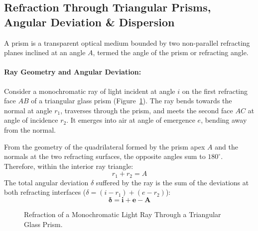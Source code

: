 \documentclass[10pt,twoside,openright]{book}
\begin{document}
\subsection{Refraction Through Triangular Prisms, Angular Deviation \& Dispersion}
A prism is a transparent optical medium bounded by two non-parallel refracting planes inclined at an angle $A$, termed the angle of the prism or refracting angle.

\paragraph{Ray Geometry and Angular Deviation:}
Consider a monochromatic ray of light incident at angle $i$ on the first refracting face $AB$ of a triangular glass prism (Figure~\ref{fig:prism_refraction}). The ray bends towards the normal at angle $r_1$, traverses through the prism, and meets the second face $AC$ at angle of incidence $r_2$. It emerges into air at angle of emergence $e$, bending away from the normal.

From the geometry of the quadrilateral formed by the prism apex $A$ and the normals at the two refracting surfaces, the opposite angles sum to $180^\circ$. Therefore, within the interior ray triangle:
\begin{equation}
  r_1 + r_2 = A
\end{equation}
The total angular deviation $\delta$ suffered by the ray is the sum of the deviations at both refracting interfaces ($\delta = (i - r_1) + (e - r_2)$):
\begin{equation}
  \mathbf{\delta = i + e - A}
\end{equation}

\begin{figure}[htbp]
\centering
{}
\caption{Refraction of a Monochromatic Light Ray Through a Triangular Glass Prism.}
\label{fig:prism_refraction}
\end{figure}
\end{document}
